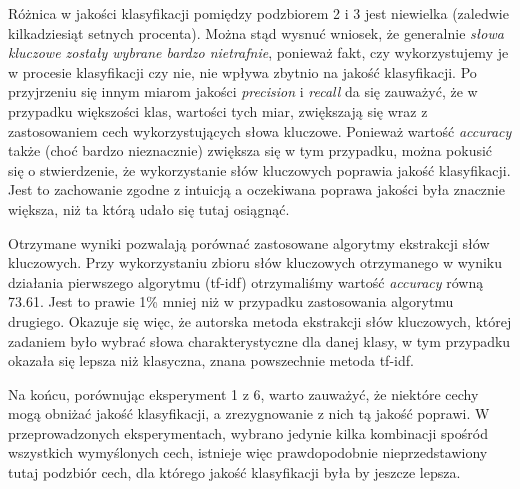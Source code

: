 \documentclass{classrep}
\begin{document}
{{            Różnica w jakości klasyfikacji pomiędzy podzbiorem 2 i 3 jest niewielka (zaledwie
            kilkadziesiąt setnych procenta). Można stąd wysnuć wniosek, że generalnie \emph{słowa
            kluczowe zostały wybrane bardzo nietrafnie}, ponieważ fakt, czy wykorzystujemy je w
            procesie klasyfikacji czy nie, nie wpływa zbytnio na jakość klasyfikacji. Po przyjrzeniu
            się innym miarom jakości \emph{precision} i \emph{recall} da się zauważyć, że w
            przypadku większości klas, wartości tych miar, zwiększają się wraz z zastosowaniem cech
            wykorzystujących słowa kluczowe. Ponieważ wartość \emph{accuracy} także (choć bardzo
            nieznacznie) zwiększa się w tym przypadku, można pokusić się o stwierdzenie, że
            wykorzystanie słów kluczowych poprawia jakość klasyfikacji. Jest to zachowanie zgodne z
            intuicją a oczekiwana poprawa jakości była znacznie większa, niż ta którą udało
            się tutaj osiągnąć.

            Otrzymane wyniki pozwalają porównać zastosowane algorytmy ekstrakcji słów kluczowych.
            Przy wykorzystaniu zbioru słów kluczowych otrzymanego w wyniku działania pierwszego
            algorytmu (tf-idf) otrzymaliśmy wartość \emph{accuracy} równą 73.61. Jest to prawie 1\%
            mniej niż w przypadku zastosowania algorytmu drugiego. Okazuje się więc, że autorska
            metoda ekstrakcji słów kluczowych, której zadaniem było wybrać słowa charakterystyczne
            dla danej klasy, w tym przypadku okazała się lepsza niż klasyczna, znana powszechnie
            metoda tf-idf.

            Na końcu, porównując eksperyment 1 z 6, warto zauważyć, że niektóre cechy mogą obniżać
            jakość klasyfikacji, a zrezygnowanie z nich tą jakość poprawi. W przeprowadzonych
            eksperymentach, wybrano jedynie kilka kombinacji spośród wszystkich wymyślonych cech,
            istnieje więc prawdopodobnie nieprzedstawiony tutaj podzbiór cech, dla którego jakość
            klasyfikacji była by jeszcze lepsza.
        }
    }
\end{document}
